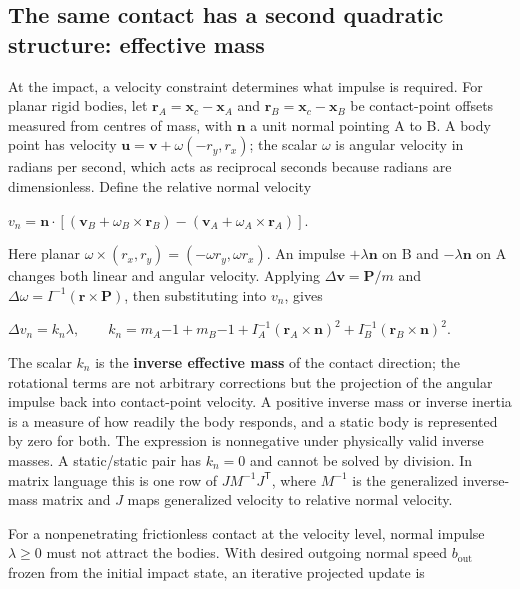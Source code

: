 \subsection{The same contact has a second quadratic structure: effective mass}\label{01-foundations-i-ch018-the-same-contact-has-a-second-quadratic-structure-effective-mass}

\hypertarget{01-foundations-i-ch018-the-same-contact-has-a-second-quadratic-structure-effective-mass}{}

At the impact, a velocity constraint determines what impulse is required. For planar rigid bodies, let \(\mathbf r_A=\mathbf x_c-\mathbf x_A\) and \(\mathbf r_B=\mathbf x_c-\mathbf x_B\) be contact-point offsets measured from centres of mass, with \(\mathbf n\) a unit normal pointing A to B. A body point has velocity \(\mathbf u=\mathbf v+\omega(-r_y,r_x)\); the scalar \(\omega\) is angular velocity in radians per second, which acts as reciprocal seconds because radians are dimensionless. Define the relative normal velocity

\(v_n=\mathbf n\cdot\left[
(\mathbf v_B+\omega_B\times\mathbf r_B)-
(\mathbf v_A+\omega_A\times\mathbf r_A)\right].\)

Here planar \(\omega\times(r_x,r_y)=(-\omega r_y,\omega r_x)\). An impulse \(+\lambda\mathbf n\) on B and \(-\lambda\mathbf n\) on A changes both linear and angular velocity. Applying \(\Delta\mathbf v=\mathbf P/m\) and \(\Delta\omega=I^{-1}(\mathbf r\times\mathbf P)\), then substituting into \(v_n\), gives

\(\Delta v_n=k_n\lambda,\qquad k_n=m_A{-1}+m_B{-1} +I_A^{-1}(\mathbf r_A\times\mathbf n)^2 +I_B^{-1}(\mathbf r_B\times\mathbf n)^2.\)

The scalar \(k_n\) is the \textbf{inverse effective mass} of the contact direction; the rotational terms are not arbitrary corrections but the projection of the angular impulse back into contact-point velocity. A positive inverse mass or inverse inertia is a measure of how readily the body responds, and a static body is represented by zero for both. The expression is nonnegative under physically valid inverse masses. A static/static pair has \(k_n=0\) and cannot be solved by division. In matrix language this is one row of \(JM^{-1}J^\mathsf T\), where \(M^{-1}\) is the generalized inverse-mass matrix and \(J\) maps generalized velocity to relative normal velocity.

For a nonpenetrating frictionless contact at the velocity level, normal impulse \(\lambda\ge0\) must not attract the bodies. With desired outgoing normal speed \(b_{\mathrm{out}}\) frozen from the initial impact state, an iterative projected update is

